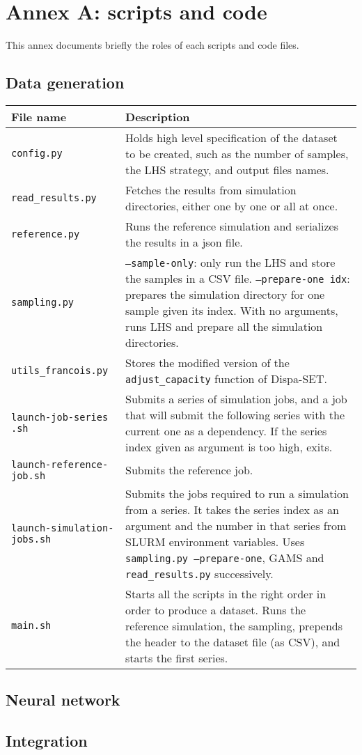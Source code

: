 \section*{Annex A: scripts and code}

This annex documents briefly the roles of each scripts and code files.

\subsection{Data generation}

\begin{table}[h]
    \centering
    \begin{tabular}{|p{}|p{}|}
        \hline
        File name & Description \\ \hline
        \texttt{config.py} & Holds high level specification of the dataset to be created, such as the number of samples, the LHS strategy, and output files names. \\
        \texttt{read\_results.py} & Fetches the results from simulation directories, either one by one or all at once. \\
        \texttt{reference.py} & Runs the reference simulation and serializes the results in a json file. \\
        \texttt{sampling.py} & \texttt{--sample-only}: only run the LHS and store the samples in a CSV file. \texttt{--prepare-one idx}: prepares the simulation directory for one sample given its index. With no arguments, runs LHS and prepare all the simulation directories. \\
        \texttt{utils\_francois.py} & Stores the modified version of the \texttt{adjust\_capacity} function of Dispa-SET. \\ \hline
        \texttt{launch-job-series} \texttt{.sh} & Submits a series of simulation jobs, and a job that will submit the following series with the current one as a dependency. If the series index given as argument is too high, exits. \\
        \texttt{launch-reference-} \texttt{job.sh} & Submits the reference job. \\
        \texttt{launch-simulation-} \texttt{jobs.sh} & Submits the jobs required to run a simulation from a series. It takes the series index as an argument and the number in that series from SLURM environment variables. Uses \texttt{sampling.py --prepare-one}, GAMS and \texttt{read\_results.py} successively. \\
        \texttt{main.sh} & Starts all the scripts in the right order in order to produce a dataset. Runs the reference simulation, the sampling, prepends the header to the dataset file (as CSV), and starts the first series. \\ \hline
    \end{tabular}
\end{table}

\subsection{Neural network}

\subsection{Integration}

